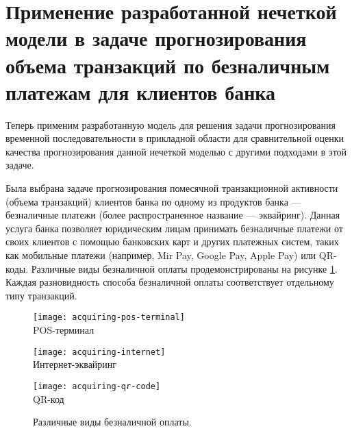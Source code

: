 \section{Применение разработанной нечеткой модели в задаче прогнозирования объема транзакций по безналичным платежам для клиентов банка}

Теперь применим разработанную модель для решения задачи прогнозирования временной последовательности в прикладной области для сравнительной оценки качества прогнозирования данной нечеткой моделью с другими подходами в этой задаче.

Была выбрана задаче прогнозирования помесячной транзакционной активности (объема транзакций) клиентов банка по одному из продуктов банка --- безналичные платежи (более распространенное название --- эквайринг). Данная услуга банка позволяет юридическим лицам принимать безналичные платежи от своих клиентов с помощью банковских карт и других платежных систем, таких как мобильные платежи (например, Mir Pay, Google Pay, Apple Pay) или QR-коды. Различные виды безналичной оплаты продемонстрированы на рисунке \cref{fig:acquiring-examples}. Каждая разновидность способа безналичной оплаты соответствует отдельному типу транзакций.

\begin{figure}[t]
	\centering
	\begin{minipage}[b][][b]{0.3\textwidth}
		\centering
		\texttt{[image: acquiring-pos-terminal]} \\ POS-терминал
	\end{minipage}
	\begin{minipage}[b][][b]{0.33\textwidth}
		\centering
		\texttt{[image: acquiring-internet]} \\ Интернет-эквайринг
	\end{minipage}
	\begin{minipage}[b][][b]{0.3\textwidth}
		\centering
		\texttt{[image: acquiring-qr-code]} \\ QR-код
	\end{minipage}
	\vfill
	\caption{Различные виды безналичной оплаты.}
	\label{fig:acquiring-examples}
\end{figure}


